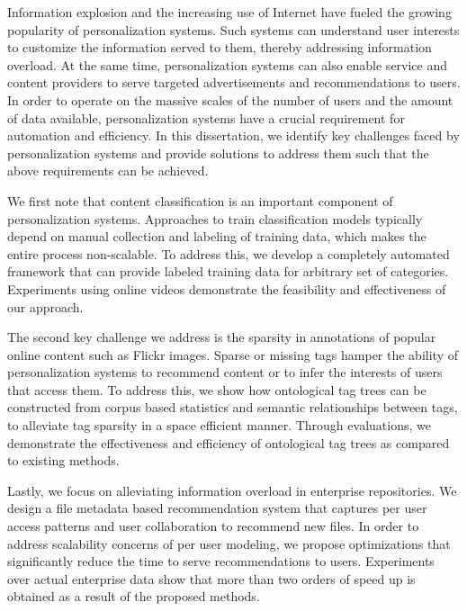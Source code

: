 \documentclass[12pt]{ucsddissertation}
\begin{document}
\begin{dissertationabstract}


Information explosion and the increasing use of Internet have fueled the growing popularity of personalization systems. Such systems can understand user interests to customize the information served to them, thereby addressing information overload. At the same time, personalization systems can also enable service and content providers to serve targeted advertisements and recommendations to users. In order to operate on the massive scales of the number of users and the amount of data available, personalization systems have a crucial requirement for automation and efficiency. In this dissertation, we identify key challenges faced by personalization systems and provide solutions to address them such that the above requirements can be achieved. 

We first note that content classification is an important component of personalization systems. Approaches to train classification models typically depend on manual collection and labeling of training data, which makes the entire process non-scalable. To address this, we develop a completely automated framework that can provide labeled training data for arbitrary set of categories. Experiments using online videos demonstrate the feasibility and effectiveness of our approach. 


The second key challenge we address is the sparsity in annotations of popular online content such as Flickr images. Sparse or missing tags hamper the ability of personalization systems to recommend content or to infer the interests of users that access them. To address this, we show how ontological tag trees can be constructed from corpus based statistics and semantic relationships between tags, to alleviate tag sparsity in a space efficient manner. Through evaluations, we demonstrate the effectiveness and efficiency of ontological tag trees as compared to existing methods. 


Lastly, we focus on alleviating information overload in enterprise repositories. We design a file metadata based recommendation system that captures per user access patterns and user collaboration to recommend new files. In order to address scalability concerns of per user modeling, we propose optimizations that significantly reduce the time to serve recommendations to users. Experiments over actual enterprise data show that more than two orders of speed up is obtained as a result of the proposed methods. 



\end{dissertationabstract}
\end{document}
